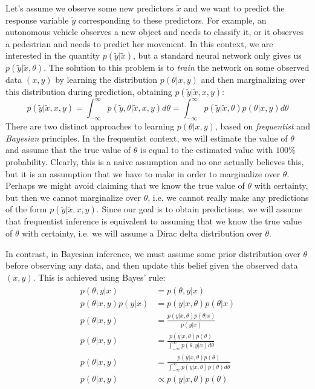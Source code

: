 \documentclass[12pt]{article}
\begin{document}
Let's assume we observe some new predictors $\tilde{x}$ and we want to predict the response variable $\tilde{y}$ corresponding to these predictors. For example, an autonomous vehicle observes a new object and needs to classify it, or it observes a pedestrian and needs to predict her movement. In this context, we are interested in the quantity $p(\tilde{y} | \tilde{x})$, but a standard neural network only gives us $p(\tilde{y} | \tilde{x}, \theta)$. The solution to this problem is to \textit{train} the network on some observed data $(x, y)$ by learning the distribution $p(\theta | x, y)$ and then marginalizing over this distribution during prediction, obtaining $p(\tilde{y} | \tilde{x}, x, y)$:
\begin{equation}
p(\tilde{y} | \tilde{x}, x, y) = \int_{-\infty}^\infty p(\tilde{y}, \theta | \tilde{x}, x, y) d\theta =   \int_{-\infty}^\infty p(\tilde{y} | \tilde{x}, \theta) p(\theta | x, y) d\theta
\label{eq_post_pred}
\end{equation}
There are two distinct approaches to learning $p(\theta | x, y)$, based on \textit{frequentist} and \textit{Bayesian} principles. In the frequentist context, we will estimate the value of $\theta$ and assume that the true value of $\theta$ is equal to the estimated value with $100\%$ probability. Clearly, this is a naive assumption and no one actually believes this, but it is an assumption that we have to make in order to marginalize over $\theta$. Perhaps we might avoid claiming that we know the true value of $\theta$ with certainty, but then we cannot marginalize over $\theta$, i.e. we cannot really make any predictions of the form $p(\tilde{y} | \tilde{x}, x, y)$. Since our goal is to obtain predictions, we will assume that frequentist inference is equivalent to assuming that we know the true value of $\theta$ with certainty, i.e. we will assume a Dirac delta distribution over $\theta$.

In contrast, in Bayesian inference, we must assume some prior distribution over $\theta$ before observing any data, and then update this belief given the observed data $(x, y)$. This is achieved using Bayes' rule:
\begin{align}
\begin{split}
p(\theta,y|x) &= p(\theta,y|x) \\
p(\theta|x,y)p(y|x) &= p(y|x,\theta)p(\theta|x)\\
p(\theta|x,y) &= \frac{p(y|x,\theta)p(\theta|x)}{p(y|x)}\\
p(\theta|x,y) &= \frac{p(y|x,\theta)p(\theta)}{\int_{-\infty}^\infty p(\theta, y|x) d\theta}\\
p(\theta|x,y) &= \frac{p(y|x,\theta)p(\theta)}{\int_{-\infty}^\infty p(y|x,\theta)p(\theta) d\theta}\\
p(\theta|x,y) &\propto p(y|x,\theta)p(\theta)
\end{split}
\label{eq_posterior}
\end{align}
\end{document}
